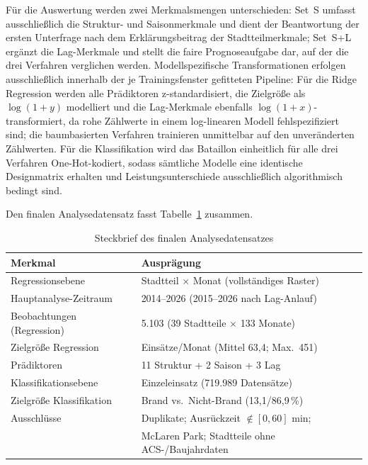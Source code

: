 Für die Auswertung werden zwei Merkmalsmengen unterschieden: Set~S umfasst
ausschließlich die Struktur- und Saisonmerkmale und dient der Beantwortung
der ersten Unterfrage nach dem Erklärungsbeitrag der Stadtteilmerkmale;
Set~S+L ergänzt die Lag-Merkmale und stellt die faire Prognoseaufgabe dar,
auf der die drei Verfahren verglichen werden. Modellspezifische
Transformationen erfolgen ausschließlich innerhalb der je Trainingsfenster
gefitteten Pipeline: Für die Ridge Regression werden alle Prädiktoren
z-standardisiert, die Zielgröße als $\log(1+y)$ modelliert und die
Lag-Merkmale ebenfalls $\log(1+x)$-transformiert, da rohe Zählwerte in einem
log-linearen Modell fehlspezifiziert sind; die baumbasierten Verfahren
trainieren unmittelbar auf den unveränderten Zählwerten. Für die
Klassifikation wird das Bataillon einheitlich für alle drei Verfahren
One-Hot-kodiert, sodass sämtliche Modelle eine identische Designmatrix
erhalten und Leistungsunterschiede ausschließlich algorithmisch bedingt sind.

Den finalen Analysedatensatz fasst Tabelle~\ref{tab:steckbrief} zusammen.

\begin{table}[htbp]
  \centering
  \caption{Steckbrief des finalen Analysedatensatzes}
  \label{tab:steckbrief}
  \begin{tabular}{ll}
    \hline
    \textbf{Merkmal} & \textbf{Ausprägung} \\
    \hline
    Regressionsebene & Stadtteil $\times$ Monat (vollständiges Raster) \\
    Hauptanalyse-Zeitraum & 2014--2026 (2015--2026 nach Lag-Anlauf) \\
    Beobachtungen (Regression) & 5.103 (39 Stadtteile $\times$ 133 Monate) \\
    Zielgröße Regression & Einsätze/Monat (Mittel 63,4; Max.\ 451) \\
    Prädiktoren & 11 Struktur + 2 Saison + 3 Lag \\
    Klassifikationsebene & Einzeleinsatz (719.989 Datensätze) \\
    Zielgröße Klassifikation & Brand vs.\ Nicht-Brand (13,1/86,9\,\%) \\
    Ausschlüsse & Duplikate; Ausrückzeit $\notin [0,60]$ min; \\
                & McLaren Park; Stadtteile ohne ACS-/Baujahrdaten \\
    \hline
  \end{tabular}
\end{table}

